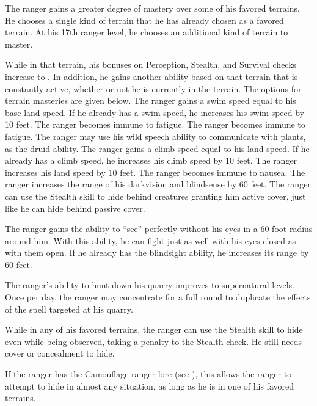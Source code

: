  The ranger gains a greater degree of mastery over some of his favored terrains. He chooses a single kind of terrain that he has already chosen as a favored terrain. At his 17th ranger level, he chooses an additional kind of terrain to master.
\par While in that terrain, his bonuses on Perception, Stealth, and Survival checks increase to . In addition, he gains another ability based on that terrain that is constantly active, whether or not he is currently in the terrain. The options for terrain masteries are given below.
 The ranger gains a swim speed equal to his base land speed. If he already has a swim speed, he increases his swim speed by 10 feet.
 The ranger becomes immune to fatigue.
 The ranger becomes immune to fatigue.
 The ranger may use his wild speech ability to communicate with plants, as the druid ability.
 The ranger gains a climb speed equal to his land speed. If he already has a climb speed, he increases his climb speed by 10 feet.
 The ranger increases his land speed by 10 feet.
 The ranger becomes immune to nausea.
 The ranger increases the range of his darkvision and blindsense by 60 feet.
 The ranger can use the Stealth skill to hide behind creatures granting him active cover, just like he can hide behind passive cover. 

 The ranger gains the ability to ``see'' perfectly without his eyes in a 60 foot radius around him. With this ability, he can fight just as well with his eyes closed as with them open. If he already has the blindsight ability, he increases its range by 60 feet.

 The ranger's ability to hunt down his quarry improves to supernatural levels. Once per day, the ranger may concentrate for a full round to duplicate the effects of the  spell targeted at his quarry.

 While in any of his favored terrains, the ranger can use the Stealth skill to hide even while being observed, taking a  penalty to the Stealth check. He still needs cover or concealment to hide.

If the ranger has the Camouflage ranger lore (see ), this allows the ranger to attempt to hide in almost any situation, as long as he is in one of his favored terrains.

